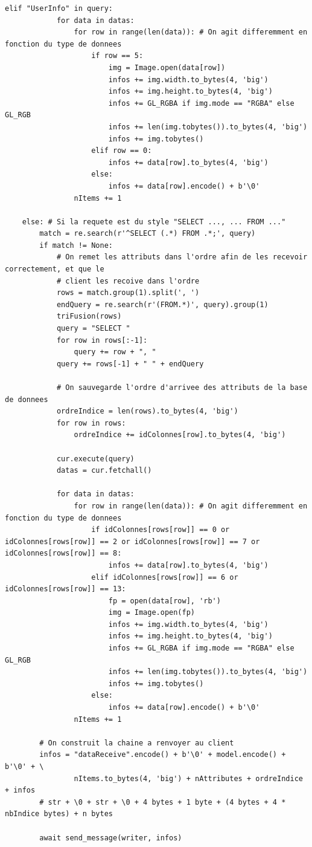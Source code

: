 \documentclass[twoside]{report}
\begin{document}
\begin{appendix}
\begin{lstlisting}[style=py, caption=serveur.py : SQL, label=sql]
        elif "UserInfo" in query:
            for data in datas:
                for row in range(len(data)): # On agit differemment en fonction du type de donnees
                    if row == 5:
                        img = Image.open(data[row])
                        infos += img.width.to_bytes(4, 'big')
                        infos += img.height.to_bytes(4, 'big')
                        infos += GL_RGBA if img.mode == "RGBA" else GL_RGB
                        infos += len(img.tobytes()).to_bytes(4, 'big')
                        infos += img.tobytes()
                    elif row == 0:
                        infos += data[row].to_bytes(4, 'big')
                    else:
                        infos += data[row].encode() + b'\0'
                nItems += 1
    
    else: # Si la requete est du style "SELECT ..., ... FROM ..."
        match = re.search(r'^SELECT (.*) FROM .*;', query)
        if match != None:
            # On remet les attributs dans l'ordre afin de les recevoir correctement, et que le
            # client les recoive dans l'ordre
            rows = match.group(1).split(', ')
            endQuery = re.search(r'(FROM.*)', query).group(1)
            triFusion(rows)
            query = "SELECT "
            for row in rows[:-1]:
                query += row + ", "
            query += rows[-1] + " " + endQuery

            # On sauvegarde l'ordre d'arrivee des attributs de la base de donnees
            ordreIndice = len(rows).to_bytes(4, 'big')
            for row in rows:
                ordreIndice += idColonnes[row].to_bytes(4, 'big')

            cur.execute(query)
            datas = cur.fetchall()

            for data in datas:
                for row in range(len(data)): # On agit differemment en fonction du type de donnees
                    if idColonnes[rows[row]] == 0 or idColonnes[rows[row]] == 2 or idColonnes[rows[row]] == 7 or idColonnes[rows[row]] == 8:
                        infos += data[row].to_bytes(4, 'big')
                    elif idColonnes[rows[row]] == 6 or idColonnes[rows[row]] == 13:
                        fp = open(data[row], 'rb')
                        img = Image.open(fp)
                        infos += img.width.to_bytes(4, 'big')
                        infos += img.height.to_bytes(4, 'big')
                        infos += GL_RGBA if img.mode == "RGBA" else GL_RGB
                        infos += len(img.tobytes()).to_bytes(4, 'big')
                        infos += img.tobytes()
                    else:
                        infos += data[row].encode() + b'\0'
                nItems += 1

        # On construit la chaine a renvoyer au client
        infos = "dataReceive".encode() + b'\0' + model.encode() + b'\0' + \
                nItems.to_bytes(4, 'big') + nAttributes + ordreIndice + infos
        # str + \0 + str + \0 + 4 bytes + 1 byte + (4 bytes + 4 * nbIndice bytes) + n bytes
        
        await send_message(writer, infos)
\end{lstlisting}
\end{appendix}
\end{document}
